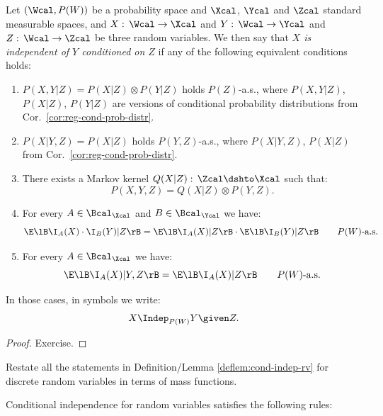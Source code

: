 \begin{DefLem}
    \label{deflem:cond-indep-rv}
        Let $(\Wcal,P(W))$ be a probability space and $\Xcal$, $\Ycal$ and $\Zcal$ standard measurable spaces, and $X:\, \Wcal \to \Xcal$ and $Y:\, \Wcal \to \Ycal$ and $Z:\, \Wcal \to \Zcal$ be three random variables. 
        We then say that \emph{$X$ is independent of $Y$ conditioned on $Z$} if any of the following equivalent conditions holds:
    \begin{enumerate}
        \item $\displaystyle P(X,Y|Z) = P(X|Z) \otimes P(Y|Z)$ holds  $P(Z)$-a.s.,
            where $P(X,Y|Z)$, $P(X|Z)$, $P(Y|Z)$ are versions of conditional probability distributions from Cor.\ \ref{cor:reg-cond-prob-distr}.
        \item $\displaystyle P(X|Y,Z) = P(X|Z)$ holds  $P(Y,Z)$-a.s., where $P(X|Y,Z)$, $P(X|Z)$ from Cor.\ \ref{cor:reg-cond-prob-distr}.
        \item There exists a Markov kernel $Q(X|Z):\, \Zcal \dshto \Xcal$ such that:
            \[ P(X,Y,Z) = Q(X|Z) \otimes P(Y,Z).\]
        \item For every $A \in \Bcal_\Xcal$ and $B \in \Bcal_\Ycal$ we have:
            \[ \E\lB \I_A(X) \cdot \I_B(Y) |Z\rB = \E\lB \I_A(X) |Z\rB \cdot \E\lB \I_B(Y) |Z\rB\qquad P(W)\text{-a.s.} \]        \item For every $A \in \Bcal_\Xcal$ we have:
            \[ \E\lB \I_A(X)  |Y, Z\rB = \E\lB \I_A(X) |Z\rB \qquad P(W)\text{-a.s.} \]
    \end{enumerate}
    In those cases, in symbols we write:
    \[ X \Indep_{P(W)} Y \given Z.\]
    \begin{proof}
        Exercise.
    \end{proof}
\end{DefLem}

\begin{Exc}
    Restate all the statements in Definition/Lemma \ref{deflem:cond-indep-rv} for discrete random variables in terms of mass functions.
\end{Exc}


Conditional independence for random variables satisfies the following rules:

